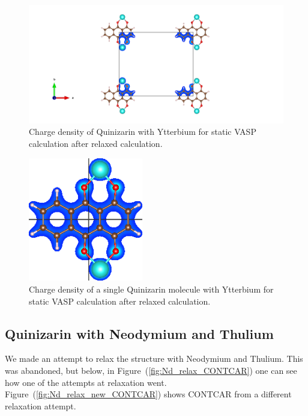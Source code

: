 \documentclass{article}
\begin{document}
      \begin{figure}[H]
          \centering
          \includegraphics[width = \textwidth]{../fig/Yb_staticafter_CHGCAR.png}
          \caption{Charge density of Quinizarin with Ytterbium for static VASP calculation after relaxed calculation. }
          \label{fig:Yb_staticafter_CHGCAR}
      \end{figure}

      \begin{figure}[H]
        \centering
        \includegraphics[width = 5cm]{../fig/Yb_staticafter_CHGDENSITY.png}
        \caption{Charge density of a single Quinizarin molecule with Ytterbium for static VASP calculation after relaxed calculation. }
        \label{fig:Yb_staticafter_CHGDENSITY}
      \end{figure}

      \vspace{1cm}

  \subsection{Quinizarin with Neodymium and Thulium}

    We made an attempt to relax the structure with Neodymium and Thulium. This was abandoned, but below, in Figure~(\ref{fig:Nd_relax_CONTCAR}) one can see how one of the attempts at relaxation went. Figure~(\ref{fig:Nd_relax_new_CONTCAR}) shows CONTCAR from a different relaxation attempt. \\
\end{document}
